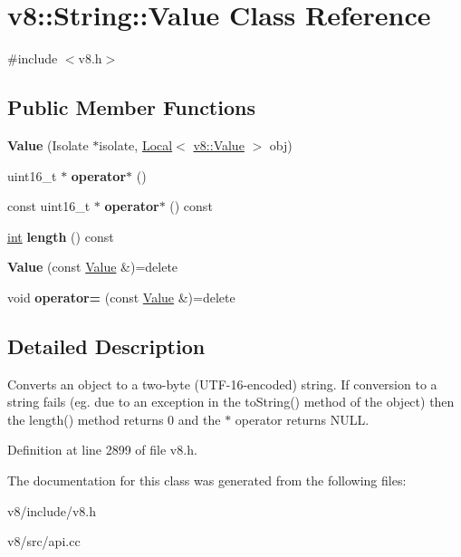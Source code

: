 \hypertarget{classv8_1_1String_1_1Value}{}\section{v8\+:\+:String\+:\+:Value Class Reference}
\label{classv8_1_1String_1_1Value}


{\ttfamily \#include $<$v8.\+h$>$}

\subsection*{Public Member Functions}
\begin{DoxyCompactItemize}
\item 
\mbox{\label{classv8_1_1String_1_1Value_a9254394df4e1c4a8d9749cc0a5b55601}} 
{\bfseries Value} (Isolate $\ast$isolate, \mbox{\hyperlink{classv8_1_1Local}{Local}}$<$ \mbox{\hyperlink{classv8_1_1Value}{v8\+::\+Value}} $>$ obj)
\item 
\mbox{\label{classv8_1_1String_1_1Value_ae4f44b1977968de2e9f2ff703437fde3}} 
uint16\+\_\+t $\ast$ {\bfseries operator$\ast$} ()
\item 
\mbox{\label{classv8_1_1String_1_1Value_a15e247c80ec874daee13e6fca1b24629}} 
const uint16\+\_\+t $\ast$ {\bfseries operator$\ast$} () const
\item 
\mbox{\label{classv8_1_1String_1_1Value_aeb5be29097c4c23c2c63fe833145dfe4}} 
\mbox{\hyperlink{classint}{int}} {\bfseries length} () const
\item 
\mbox{\label{classv8_1_1String_1_1Value_ac7ef41f1e6890bb36bde462a11ea4de1}} 
{\bfseries Value} (const \mbox{\hyperlink{classv8_1_1String_1_1Value}{Value}} \&)=delete
\item 
\mbox{\label{classv8_1_1String_1_1Value_adb46ab85e1def9411012c67cbefb3385}} 
void {\bfseries operator=} (const \mbox{\hyperlink{classv8_1_1String_1_1Value}{Value}} \&)=delete
\end{DoxyCompactItemize}


\subsection{Detailed Description}
Converts an object to a two-\/byte (U\+T\+F-\/16-\/encoded) string. If conversion to a string fails (eg. due to an exception in the to\+String() method of the object) then the length() method returns 0 and the $\ast$ operator returns N\+U\+LL. 

Definition at line 2899 of file v8.\+h.



The documentation for this class was generated from the following files\+:\begin{DoxyCompactItemize}
\item 
v8/include/v8.\+h\item 
v8/src/api.\+cc\end{DoxyCompactItemize}
